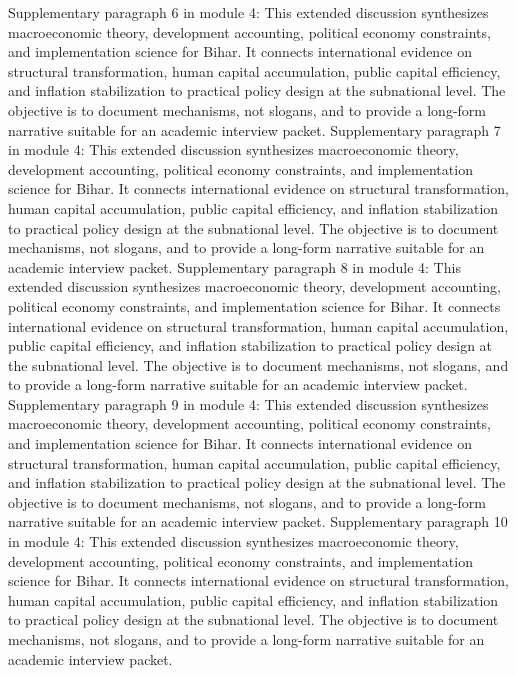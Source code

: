 \documentclass[preprint,12pt]{elsarticle}
\begin{document}
Supplementary paragraph 6 in module 4: This extended discussion synthesizes macroeconomic theory, development accounting, political economy constraints, and implementation science for Bihar. It connects international evidence on structural transformation, human capital accumulation, public capital efficiency, and inflation stabilization to practical policy design at the subnational level. The objective is to document mechanisms, not slogans, and to provide a long-form narrative suitable for an academic interview packet.
Supplementary paragraph 7 in module 4: This extended discussion synthesizes macroeconomic theory, development accounting, political economy constraints, and implementation science for Bihar. It connects international evidence on structural transformation, human capital accumulation, public capital efficiency, and inflation stabilization to practical policy design at the subnational level. The objective is to document mechanisms, not slogans, and to provide a long-form narrative suitable for an academic interview packet.
Supplementary paragraph 8 in module 4: This extended discussion synthesizes macroeconomic theory, development accounting, political economy constraints, and implementation science for Bihar. It connects international evidence on structural transformation, human capital accumulation, public capital efficiency, and inflation stabilization to practical policy design at the subnational level. The objective is to document mechanisms, not slogans, and to provide a long-form narrative suitable for an academic interview packet.
Supplementary paragraph 9 in module 4: This extended discussion synthesizes macroeconomic theory, development accounting, political economy constraints, and implementation science for Bihar. It connects international evidence on structural transformation, human capital accumulation, public capital efficiency, and inflation stabilization to practical policy design at the subnational level. The objective is to document mechanisms, not slogans, and to provide a long-form narrative suitable for an academic interview packet.
Supplementary paragraph 10 in module 4: This extended discussion synthesizes macroeconomic theory, development accounting, political economy constraints, and implementation science for Bihar. It connects international evidence on structural transformation, human capital accumulation, public capital efficiency, and inflation stabilization to practical policy design at the subnational level. The objective is to document mechanisms, not slogans, and to provide a long-form narrative suitable for an academic interview packet.
\end{document}
